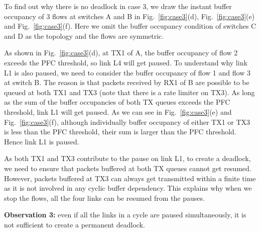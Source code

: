 To find out why there is no deadlock in case 3, we draw the instant buffer occupancy of 3 flows at switches A and B in Fig.~\ref{fig:case3}(d), Fig.~\ref{fig:case3}(e) and Fig.~\ref{fig:case3}(f). Here we omit the buffer occupancy condition of switches C and D as the topology and the flows are symmetric.

As shown in Fig.~\ref{fig:case3}(d), at TX1 of A, the buffer occupancy of flow 2 exceeds the PFC threshold, so link L4 will get paused. To understand why link L1 is also paused, we need to consider the buffer occupancy of flow 1 and flow 3 at switch B. The reason is that packets received by RX1 of B are possible to be queued at both TX1 and TX3 (note that there is a rate limiter on TX3). As long as the sum of the buffer occupancies of both TX queues exceeds the PFC threshold, link L1 will get paused. As we can see in Fig.~\ref{fig:case3}(e) and Fig.~\ref{fig:case3}(f), although individually buffer occupancy of either TX1 or TX3 is less than the PFC threshold, their sum is larger than the PFC threshold. Hence link L1 is paused.

As both TX1 and TX3 contribute to the pause on link L1, to create a deadlock, we need to ensure that packets buffered at both TX queues cannot get resumed. However, packets buffered at TX3 can always get transmitted within a finite time as it is not involved in any cyclic buffer dependency. This explains why when we stop the flows, all the four links can be resumed from the pauses. 


\textbf{Observation 3:} even if all the links in a cycle are paused simultaneously, it is not sufficient to create a permanent deadlock.

